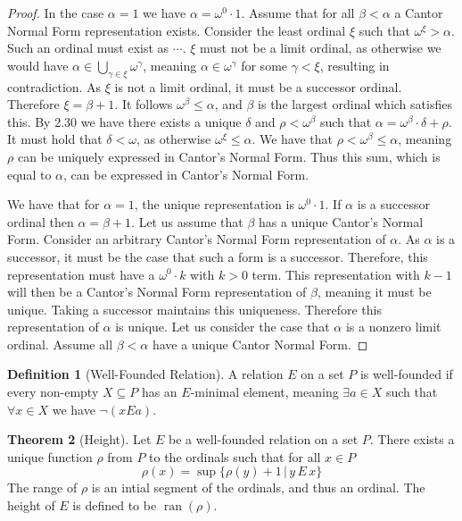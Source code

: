 \documentclass{article}
\theoremstyle{definition}
\newtheorem{thm}{Theorem}[section]
\newtheorem{defn}[thm]{Definition}
\DeclareMathOperator{\ran}{ran}
\begin{document}
\begin{proof}
    In the case $\alpha = 1$ we have $\alpha = \omega^0 \cdot 1$. Assume that for all $\beta < \alpha$ a Cantor Normal Form representation exists. Consider the least ordinal $\xi$ such that $\omega^\xi > \alpha$. Such an ordinal must exist as $\cdots$. $\xi$ must not be a limit ordinal, as otherwise we would have $\alpha \in \bigcup_{\gamma \in \xi} \omega^\gamma$, meaning $\alpha \in \omega^\gamma$ for some $\gamma < \xi$, resulting in contradiction. As $\xi$ is not a limit ordinal, it must be a successor ordinal. Therefore $\xi = \beta + 1$. It follows $\omega^\beta \le \alpha$, and $\beta$ is the largest ordinal which satisfies this. By 2.30 we have there exists a unique $\delta$ and $\rho < \omega^\beta$ such that $\alpha = \omega^\beta \cdot \delta + \rho$. It must hold that $\delta < \omega$, as otherwise $\omega^\xi \le \alpha$. We have that $\rho < \omega^\beta \le \alpha$, meaning $\rho$ can be uniquely expressed in Cantor's Normal Form. Thus this sum, which is equal to $\alpha$, can be expressed in Cantor's Normal Form.

    We have that for $\alpha = 1$, the unique representation is $\omega^0 \cdot 1$. If $\alpha$ is a successor ordinal then $\alpha = \beta + 1$. Let us assume that $\beta$ has a unique Cantor's Normal Form. Consider an arbitrary Cantor's Normal Form representation of $\alpha$. As $\alpha$ is a successor, it must be the case that such a form is a successor. Therefore, this representation must have a $\omega^0 \cdot k$ with $k > 0$ term. This representation with $k - 1$ will then be a Cantor's Normal Form representation of $\beta$, meaning it must be unique. Taking a successor maintains this uniqueness. Therefore this representation of $\alpha$ is unique. Let us consider the case that $\alpha$ is a nonzero limit ordinal. Assume all $\beta < \alpha$ have a unique Cantor Normal Form.
\end{proof}

\begin{defn}[Well-Founded Relation]
    A relation $E$ on a set $P$ is well-founded if every non-empty $X \subseteq P$ has an $E$-minimal element, meaning $\exists a \in X$ such that $\forall x \in X$ we have $\neg(x E a)$. 
\end{defn}

\begin{thm}[Height]
    Let $E$ be a well-founded relation on a set $P$. There exists a unique function $\rho$ from $P$ to the ordinals such that for all $x \in P$
    \[
        \rho(x) = \sup\{ \rho(y) + 1 \, | \, y \, E \, x \}    
    \]
    The range of $\rho$ is an intial segment of the ordinals, and thus an ordinal. The height of $E$ is defined to be $\ran(\rho)$.
\end{thm}
\end{document}
